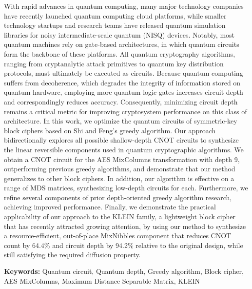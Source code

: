 With rapid advances in quantum computing, many major technology companies have recently launched quantum computing cloud platforms, while smaller technology startups and research teams have released quantum simulation libraries for noisy intermediate-scale quantum (NISQ) devices. Notably, most quantum machines rely on gate-based architectures, in which quantum circuits form the backbone of these platforms. All quantum cryptography algorithms, ranging from cryptanalytic attack primitives to quantum key distribution protocols, must ultimately be executed as circuits. Because quantum computing suffers from decoherence, which degrades the integrity of information stored on quantum hardware, employing more quantum logic gates increases circuit depth and correspondingly reduces accuracy. Consequently, minimizing circuit depth remains a critical metric for improving cryptosystem performance on this class of architecture. In this work, we optimize the quantum circuits of symmetric-key block ciphers based on Shi and Feng's greedy algorithm. Our approach bidirectionally explores all possible shallow-depth CNOT circuits to synthesize the linear reversible components used in quantum cryptographic algorithms. We obtain a CNOT circuit for the AES MixColumns transformation with depth 9, outperforming previous greedy algorithms, and demonstrate that our method generalizes to other block ciphers. In addition, our algorithm is effective on a range of MDS matrices, synthesizing low-depth circuits for each. Furthermore, we refine several components of prior depth-oriented greedy algorithm research, achieving improved performance. Finally, we demonstrate the practical applicability of our approach to the KLEIN family, a lightweight block cipher that has recently attracted growing attention, by using our method to synthesize a resource-efficient, out-of-place MixNibbles component that reduces CNOT count by 64.4\% and circuit depth by 94.2\% relative to the original design, while still satisfying the required diffusion property.

\medskip
\textbf{Keywords:} Quantum circuit, Quantum depth, Greedy algorithm, Block cipher, AES MixColumns, Maximum Distance Separable Matrix, KLEIN
